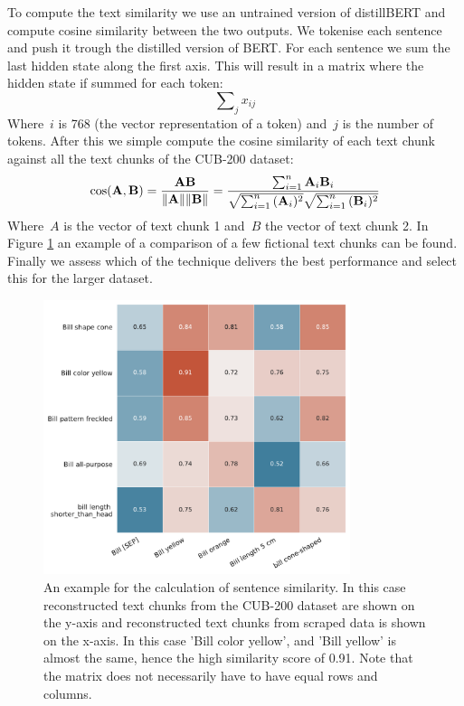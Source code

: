 \documentclass[a4paper, 12pt, oneside]{book} %
\begin{document}
To compute the text similarity we use an untrained version of distillBERT and compute cosine similarity between the two outputs.
We tokenise each sentence and push it trough the distilled version of BERT.
For each sentence we sum the last hidden state along the first axis.
This will result in a matrix where the hidden state if summed for each token:
\begin{equation}
     \sum\nolimits_{j}^{} x_{ij} 
\end{equation}
Where~$i$ is 768 (the vector representation of a token) and~$j$ is the number of tokens. 
After this we simple compute the cosine similarity of each text chunk against all the text chunks of the CUB-200 dataset:
\begin{equation}
\cos ({\bf A},{\bf B})= {{\bf A} {\bf B} \over \|{\bf A}\| \|{\bf B}\|} = \frac{ \sum_{i=1}^{n}{{\bf A}_i{\bf B}_i} }{ \sqrt{\sum_{i=1}^{n}{({\bf A}_i)^2}} \sqrt{\sum_{i=1}^{n}{({\bf B}_i)^2}} }
\end{equation}
Where~$A$ is the vector of text chunk 1 and~$B$ the vector of text chunk 2. 
In Figure \ref{fig:similarity_matrix} an example of a comparison of a few fictional text chunks can be found. 
Finally we assess which of the technique delivers the best performance and select this for the larger dataset.

\begin{figure} [h!]
    \centering
    \hspace{-2cm}
    \includegraphics[width=0.8\textwidth]{similarity_matrix.pdf}
    \caption[Example of sentence similarity]{An example for the calculation of sentence similarity. 
    In this case reconstructed text chunks from the CUB-200 dataset are shown on the y-axis and reconstructed text chunks from scraped data is shown on the x-axis. In this case 'Bill color yellow', and 'Bill yellow' is almost the same, hence the high similarity score of 0.91. Note that the matrix does not necessarily have to have equal rows and columns.}
    \label{fig:similarity_matrix}
\end{figure}
\end{document}
